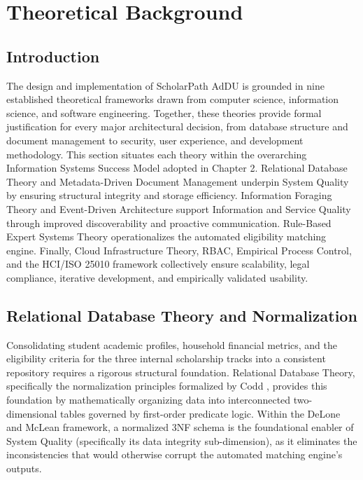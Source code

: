 \section{Theoretical Background}
\label{sec:theory}

\subsection{Introduction}

The design and implementation of ScholarPath AdDU is grounded in nine established theoretical frameworks drawn from computer science, information science, and software engineering. Together, these theories provide formal justification for every major architectural decision, from database structure and document management to security, user experience, and development methodology. This section situates each theory within the overarching Information Systems Success Model \cite{ref20} adopted in Chapter 2. Relational Database Theory and Metadata-Driven Document Management underpin System Quality by ensuring structural integrity and storage efficiency. Information Foraging Theory and Event-Driven Architecture support Information and Service Quality through improved discoverability and proactive communication. Rule-Based Expert Systems Theory operationalizes the automated eligibility matching engine. Finally, Cloud Infrastructure Theory, RBAC, Empirical Process Control, and the HCI/ISO 25010 framework collectively ensure scalability, legal compliance, iterative development, and empirically validated usability.

\subsection{Relational Database Theory and Normalization}

Consolidating student academic profiles, household financial metrics, and the eligibility criteria for the three internal scholarship tracks into a consistent repository requires a rigorous structural foundation. Relational Database Theory, specifically the normalization principles formalized by Codd \cite{ref17}, provides this foundation by mathematically organizing data into interconnected two-dimensional tables governed by first-order predicate logic. Within the DeLone and McLean \cite{ref20} framework, a normalized 3NF schema is the foundational enabler of System Quality (specifically its data integrity sub-dimension), as it eliminates the inconsistencies that would otherwise corrupt the automated matching engine's outputs.

